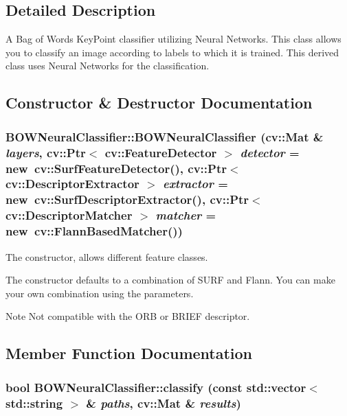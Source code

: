 \subsection{Detailed Description}
A Bag of Words KeyPoint classifier utilizing Neural Networks. This class allows you to classify an image according to labels to which it is trained. This derived class uses Neural Networks for the classification. 

\subsection{Constructor \& Destructor Documentation}
\hypertarget{classBOWNeuralClassifier_a98d08040e7d499f34c31a03d70cc7266}{
\subsubsection[{BOWNeuralClassifier}]{\setlength{\rightskip}{0pt plus 5cm}BOWNeuralClassifier::BOWNeuralClassifier (cv::Mat \& {\em layers}, \/  cv::Ptr$<$ cv::FeatureDetector $>$ {\em detector} = {\ttfamily new~cv::SurfFeatureDetector()}, \/  cv::Ptr$<$ cv::DescriptorExtractor $>$ {\em extractor} = {\ttfamily new~cv::SurfDescriptorExtractor()}, \/  cv::Ptr$<$ cv::DescriptorMatcher $>$ {\em matcher} = {\ttfamily new~cv::FlannBasedMatcher()})}}
\label{classBOWNeuralClassifier_a98d08040e7d499f34c31a03d70cc7266}


The constructor, allows different feature classes. 

The constructor defaults to a combination of SURF and Flann. You can make your own combination using the parameters.

\begin{DoxyNote}{Note}
Not compatible with the ORB or BRIEF descriptor. 
\end{DoxyNote}


\subsection{Member Function Documentation}
\hypertarget{classBOWNeuralClassifier_afbb503e23b8f881917ab1ea1cc6e2ece}{
\subsubsection[{classify}]{\setlength{\rightskip}{0pt plus 5cm}bool BOWNeuralClassifier::classify (const std::vector$<$ std::string $>$ \& {\em paths}, \/  cv::Mat \& {\em results})}}
\label{classBOWNeuralClassifier_afbb503e23b8f881917ab1ea1cc6e2ece}



